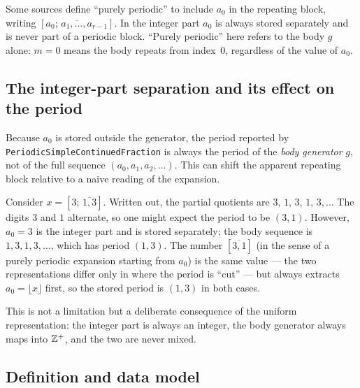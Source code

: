 \begin{remark}
  Some sources define ``purely periodic'' to include $a_0$ in the repeating
  block, writing $[\overline{a_0;\,a_1,\ldots,a_{r-1}}]$.  In \catena the
  integer part $a_0$ is always stored separately and is never part of a
  periodic block.  ``Purely periodic'' here refers to the body $g$ alone:
  $m = 0$ means the body repeats from index~$0$, regardless of the value
  of $a_0$.
\end{remark}

\subsection{The integer-part separation and its effect on the period}

Because $a_0$ is stored outside the generator, the period reported by
\texttt{PeriodicSimpleContinuedFraction} is always the period of the
\emph{body generator} $g$, not of the full sequence $(a_0, a_1, a_2, \ldots)$.
This can shift the apparent repeating block relative to a naive reading of the
expansion.

\begin{example}
  Consider $x = [3;\,\overline{1,3}]$.  Written out, the partial quotients are
  $3,\,1,\,3,\,1,\,3,\ldots$  The digits $3$ and $1$ alternate, so one might
  expect the period to be $(3, 1)$.  However, $a_0 = 3$ is the integer part and
  is stored separately; the body sequence is $1, 3, 1, 3, \ldots$, which has
  period $(1, 3)$.  The number $[\overline{3,1}]$ (in the sense of a purely
  periodic expansion starting from $a_0$) is the same value — the two
  representations differ only in where the period is ``cut'' — but \catena
  always extracts $a_0 = \lfloor x \rfloor$ first, so the stored period is
  $(1, 3)$ in both cases.
\end{example}

This is not a limitation but a deliberate consequence of the uniform
representation: the integer part is always an integer, the body generator
always maps into $\mathbb{Z}^+$, and the two are never mixed.

\subsection{Definition and data model}


